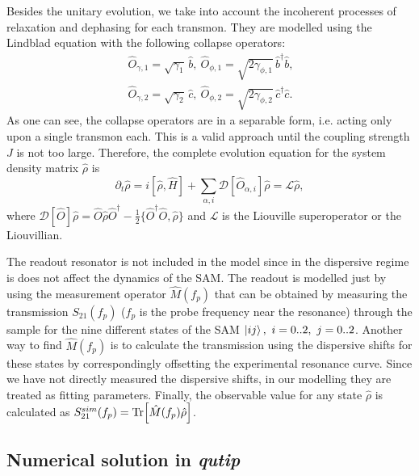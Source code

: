 \documentclass[%
 aip,
 amsmath,amssymb,
 reprint,%
]{revtex4-1}
\begin{document}
Besides the unitary evolution, we take into account the incoherent processes of relaxation and dephasing for each transmon. They are modelled using the Lindblad equation with the following collapse operators:
\begin{equation}\
\begin{split}
\hat{{O}}_{\gamma, 1} = \sqrt{\gamma_1}\, \hat b,\ 
\hat{{O}}_{\phi, 1} = \sqrt{2\gamma_{\phi,1}}\, \hat b^\dag \hat b,\\
\hat{{O}}_{\gamma,2} = \sqrt{\gamma_2}\, \hat c,\ 
\hat{{O}}_{\phi,2} = \sqrt{2\gamma_{ \phi,2}}\, \hat c^\dag \hat c.
\end{split}
\end{equation}
As one can see, the collapse operators are in a separable form, i.e. acting only upon a single transmon each. This is a valid approach until the coupling strength $J$ is not too large\cite{beaudoin2011dissipation}. Therefore, the complete evolution equation for the system density matrix $\hat \rho$ is
\begin{equation}
\partial_t \hat \rho = {i}[\hat \rho, \hat H] + \sum_{\alpha, i} \mathcal{D}[\hat{O}_{\alpha, i}] \hat \rho = \mathcal{L}\hat\rho, \label{eq:master}
\end{equation}
where $\mathcal{D}[\hat{{O}}]\hat \rho = \hat{{O}} \hat \rho \hat{{O}}^\dag - \frac{1}{2}\{ \hat{{O}}^\dag \hat{{O}}, \hat \rho\}$ and $\mathcal{L}$ is the Liouville superoperator or the Liouvillian.


The readout resonator is not included in the model since in the dispersive regime is does not affect the dynamics of the SAM. The readout is modelled just by using the measurement operator $\hat M(f_p)$ that can be obtained by measuring the transmission $S_{21}(f_p)$ ($f_p$ is the probe frequency near the resonance) through the sample for the nine different states of the SAM $\ket{ij},\ i=0..2,\ j=0..2$\cite{filipp2009two}. Another way to find $\hat M(f_p)$ is to calculate the transmission using the dispersive shifts for these states by correspondingly offsetting the experimental resonance curve. Since we have not directly measured the dispersive shifts, in our modelling they are treated as fitting parameters. Finally, the observable value for any state $\hat \rho$ is calculated as $S_{21}^{sim}(f_p) = \Tr[\hat M(f_p) \hat \rho]$.


\subsection{Numerical solution in \textit{qutip}}
\end{document}
